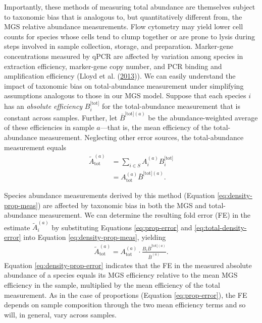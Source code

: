 \documentclass[
]{article}
\begin{document}
Importantly, these methods of measuring total abundance are themselves subject to taxonomic bias that is analogous to, but quantitatively different from, the MGS relative abundance measurements.
Flow cytometry may yield lower cell counts for species whose cells tend to clump together or are prone to lysis during steps involved in sample collection, storage, and preparation.
Marker-gene concentrations measured by qPCR are affected by variation among species in extraction efficiency, marker-gene copy number, and PCR binding and amplification efficiency (Lloyd et al. (\protect\hyperlink{ref-lloyd2013meta}{2013})).
We can easily understand the impact of taxonomic bias on total-abundance measurement under simplifying assumptions analogous to those in our MGS model.
Suppose that each species \(i\) has an \emph{absolute efficiency} \(B_{i}^{{\text{[tot]}}}\) for the total-abundance measurement that is constant across samples.
Further, let \(\bar B^{{\text{[tot]}}(a)}\) be the abundance-weighted average of these efficiencies in sample \(a\)---that is, the mean efficiency of the total-abundance measurement.
Neglecting other error sources, the total-abundance measurement equals
\begin{align}
  \label{eq:total-density-error}
  \tilde A_{\text{tot}}^{(a)} 
  &= \sum_{i\in S} A_i^{(a)} B_{i}^{{\text{[tot]}}}
  \\&= A_{\text{tot}}^{(a)} \bar B^{{\text{[tot]}}(a)}.
\end{align}

Species abundance measurements derived by this method (Equation \eqref{eq:density-prop-meas}) are affected by taxonomic bias in both the MGS and total-abundance measurement.
We can determine the resulting fold error (FE) in the estimate \(\tilde A_i^{(a)}\) by substituting Equations \eqref{eq:prop-error} and \eqref{eq:total-density-error} into Equation \eqref{eq:density-prop-meas}, yielding
\begin{align}
  \label{eq:density-prop-error}
  \tilde A_{\text{tot}}^{(a)}
  = A_{\text{tot}}^{(a)} \cdot \frac{B_i \bar B^{{\text{[tot]}}(a)}}{\bar B^{(a)}}.
\end{align}
Equation \eqref{eq:density-prop-error} indicates that the FE in the measured absolute abundance of a species equals its MGS efficiency relative to the mean MGS efficiency in the sample, multiplied by the mean efficiency of the total measurement.
As in the case of proportions (Equation \eqref{eq:prop-error}), the FE depends on sample composition through the two mean efficiency terms and so will, in general, vary across samples.
\end{document}
